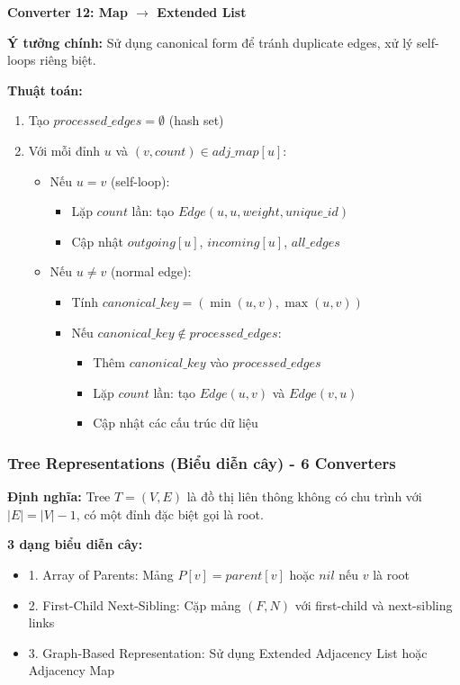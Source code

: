\documentclass[12pt,a4paper]{article}
\begin{document}
\textbf{Converter 12: Map $\rightarrow$ Extended List}

\textbf{Ý tưởng chính:} Sử dụng canonical form để tránh duplicate edges, xử lý self-loops riêng biệt.

\textbf{Thuật toán:}
\begin{enumerate}
    \item Tạo $processed\_edges = \emptyset$ (hash set)
    \item Với mỗi đỉnh $u$ và $(v, count) \in adj\_map[u]$:
    \begin{itemize}
        \item Nếu $u = v$ (self-loop):
        \begin{itemize}
            \item Lặp $count$ lần: tạo $Edge(u,u,weight,unique\_id)$
            \item Cập nhật $outgoing[u]$, $incoming[u]$, $all\_edges$
        \end{itemize}
        \item Nếu $u \neq v$ (normal edge):
        \begin{itemize}
            \item Tính $canonical\_key = (\min(u,v), \max(u,v))$
            \item Nếu $canonical\_key \notin processed\_edges$:
            \begin{itemize}
                \item Thêm $canonical\_key$ vào $processed\_edges$
                \item Lặp $count$ lần: tạo $Edge(u,v)$ và $Edge(v,u)$
                \item Cập nhật các cấu trúc dữ liệu
            \end{itemize}
        \end{itemize}
    \end{itemize}
\end{enumerate}

\subsubsection{Tree Representations (Biểu diễn cây) - 6 Converters}

\textbf{Định nghĩa:} Tree $T = (V, E)$ là đồ thị liên thông không có chu trình với $|E| = |V| - 1$, có một đỉnh đặc biệt gọi là root.
\vspace{0.5cm}

\textbf{3 dạng biểu diễn cây:}
\begin{itemize}[label=\textbullet]
    \item 1. Array of Parents: Mảng $P[v] = parent[v]$ hoặc $nil$ nếu $v$ là root
    \item 2. First-Child Next-Sibling: Cặp mảng $(F, N)$ với first-child và next-sibling links
    \item 3. Graph-Based Representation: Sử dụng Extended Adjacency List hoặc Adjacency Map
\end{itemize}
\end{document}
